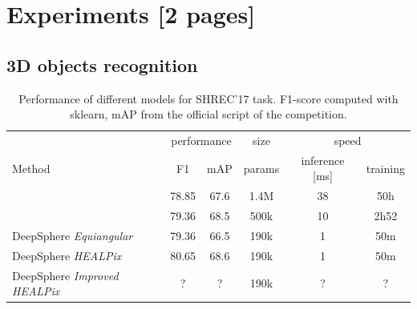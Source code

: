 \documentclass{article} %
\newcommand{\todo}[1]{{\color[rgb]{.6,.1,.6}{#1}}}
\begin{document}
\section{Experiments [2 pages]}

\todo{
Show: \\
* meet the desiderata \\
* DeepSphere V1 and V2 are equivalent in practice, wait on SHREC and cosmo exp \\
* anisotropy doesn't help \\
}

\subsection{3D objects recognition}

\todo{
* same perf as other spherical CNNs, but 40 times faster \\
* compare samplings (equi, HEALPix) $\Rightarrow$ not much difference \\
* compare with improved graph (Nside=32) $\Rightarrow$ no improvement as information in the low frequencies (PSD, and works down to nside=8) \\
* ModelNet 40: same conclusions $\Rightarrow$ appendix \\
}

\begin{table}
    \centering
    \begin{tabular}{l|c c c c c}
        \multicolumn{1}{l}{} & \multicolumn{2}{c}{performance} & \multicolumn{1}{c}{size} & \multicolumn{2}{c}{speed}\\
        \cmidrule(lr){2-3} \cmidrule(lr){4-4} \cmidrule(lr){5-6}
        \multicolumn{1}{l}{Method} & F1 & mAP & params & inference [ms] & training \\ \hline
        \cite{cohen2018sphericalcnn} & 78.85 & 67.6 & 1.4M & 38 & 50h\\
        \cite{esteves2018sphericalcnn} & 79.36 & 68.5 & 500k & 10 & 2h52\\ \hline
        DeepSphere \emph{Equiangular} & 79.36 & 66.5 & 190k & 1 & 50m \\
        DeepSphere \emph{HEALPix} & 80.65 & 68.6 & 190k & 1 & 50m\\
        DeepSphere \emph{Improved HEALPix} & ? & ? & 190k & ? & ?
    \end{tabular}
    \caption{Performance of different models for SHREC'17 task. F1-score computed with sklearn, mAP from the official script of the competition.}
    \label{tab:SHREC17_class}
\end{table}
\end{document}
